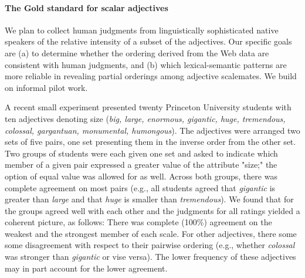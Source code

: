 \documentclass[10pt]{article}
\begin{document}
\paragraph{The Gold standard for scalar adjectives}
We plan to collect human judgments from linguistically sophisticated native speakers of the relative intensity of a subset of the adjectives. 
Our specific goals are (a) to determine whether the ordering derived from the Web data are consistent with human judgments, and (b) 
which lexical-semantic patterns are more reliable in revealing partial orderings among adjective scalemates. 
We build on informal pilot work.  

A recent small experiment presented twenty Princeton University students with ten adjectives denoting 
size (\textit{big, large, enormous, gigantic, huge, tremendous, colossal, gargantuan, monumental, humongous}). 
The adjectives were arranged two sets of five pairs, one set presenting them in the inverse order from the other set. 
Two groups of students were each given one set and 
asked to indicate which member of a given pair expressed a greater value of the attribute "size;"
the option of equal value was allowed for as well. Across both groups, there was complete agreement on most pairs (e.g., all 
students agreed that \textit{gigantic} is greater than \textit{large} and that \textit{huge} is smaller than \textit{tremendous}).
We found that for the groups agreed well with each other and the judgments for all ratings yielded a coherent picture, as follows: 
There was complete (100\%) agreement on the weakest and the strongest member of each scale. For other adjectives, 
there some some disagreement with respect to their pairwise ordering (e.g., whether \emph{colossal} was stronger than 
\emph{gigantic} or vise versa). The lower frequency of these adjectives may in part account for the lower agreement. 
\end{document}
